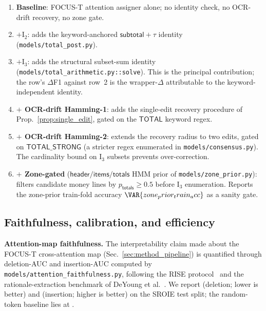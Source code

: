 \begin{enumerate}[label=\arabic*.,leftmargin=2.0em]
\item \textbf{Baseline}: FOCUS-T attention assigner alone; no
  identity check, no OCR-drift recovery, no zone gate.
\item \textbf{$+\mathrm{I}_2$}: adds the keyword-anchored
  $\textsf{subtotal}+\tau$ identity (\texttt{models/total\_post.py}).
\item \textbf{$+\mathrm{I}_3$}: adds the structural subset-sum
  identity (\texttt{models/total\_arithmetic.py::solve}).  This is
  the principal contribution; the row's $\Delta$F1 against row~2 is
  the wrapper-$\Delta$ attributable to the keyword-independent
  identity.
\item \textbf{$+$ OCR-drift Hamming-1}: adds the single-edit recovery
  procedure of Prop.~\ref{prop:single_edit}, gated on the
  $\textsf{TOTAL}$ keyword regex.
\item \textbf{$+$ OCR-drift Hamming-2}: extends the recovery radius
  to two edits, gated on $\textsf{TOTAL\_STRONG}$ (a stricter regex
  enumerated in \texttt{models/consensus.py}).  The cardinality
  bound on $\mathrm{I}_3$ subsets prevents over-correction.
\item \textbf{$+$ Zone-gated} ($\textsf{header} / \textsf{items} /
  \textsf{totals}$ HMM prior of \texttt{models/zone\_prior.py}):
  filters candidate money lines by $p_{\textsf{totals}}\geq 0.5$
  before $\mathrm{I}_3$ enumeration.  Reports the zone-prior
  train-fold accuracy
  $\VAR{zone_prior_train_acc}$ as a sanity gate.
\end{enumerate}

\subsection{Faithfulness, calibration, and efficiency}
\label{sec:experiments_aux}

\textbf{Attention-map faithfulness.}  The interpretability claim made
about the FOCUS-T cross-attention map (Sec.~\ref{sec:method_pipeline})
is quantified through deletion-AUC and insertion-AUC computed by
\texttt{models/attention\_faithfulness.py}, following the RISE
protocol~\cite{petsiuk2018rise} and the rationale-extraction
benchmark of DeYoung et al.~\cite{deyoung2020eraser}.  We report
 (deletion; lower is better) and
 (insertion; higher is better) on
the SROIE test split; the random-token baseline lies at
.

